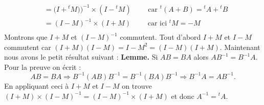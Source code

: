 {\begin{enumerate}
{\begin{align*}
  & = \big( I+{}^t\!M) \big)^{-1}\times(I-{}^t\!M) \qquad \text{ car } {}^t\!(A+B)={}^t\!A+{}^t\!B \\
  & = (I-M) ^{-1}\times (I+M) \qquad \text{ car ici } {}^{t}\!{M} = -M \\  
\end{align*}
Montrons que $I+M$ et $(I-M) ^{-1}$ commutent.
Tout d'abord $I+M$ et $I-M$ commutent car $(I+M)(I-M) = I-M^2 = (I-M)(I+M)$.
Maintenant nous avons le petit résultat suivant :
\textbf{Lemme.} Si $AB=BA$ alors $AB^{-1}=B^{-1}A$.
Pour la preuve on écrit :
$$AB=BA \Rightarrow B^{-1}(AB)B^{-1}=B^{-1}(BA)B^{-1} \Rightarrow B^{-1}A=AB^{-1}.$$
En appliquant ceci à $I+M$ et $I-M$ on trouve $(I+M)\times (I-M) ^{-1}= (I-M) ^{-1}\times(I+M)$
et donc $A^{-1}={}^t\!A$.
}
\end{enumerate}
}
